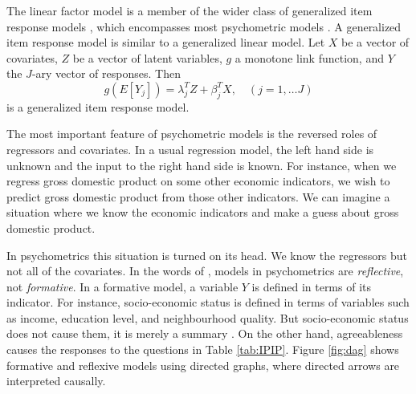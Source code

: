 The linear factor model is a member of the wider class of generalized item response models \parencite{Mellenbergh1994-iy}, which encompasses most psychometric models \parencite[Chapter 3.1]{Borsboom2005-iq}. A generalized item response model is similar to a generalized linear model. Let $X$ be a vector of covariates, $Z$ be a vector of latent variables, $g$ a monotone link function, and $Y$ the $J$-ary vector of responses. Then 
\begin{equation}
g(E[Y_{j}])=\lambda_{j}^{T}Z+\beta_{j}^{T}X,\quad(j=1,\ldots J)\label{eq:GLIRT model}
\end{equation}
is a generalized item response model.

The most important feature of psychometric models is the reversed roles of regressors and covariates. In a usual regression model, the left hand side is unknown and the input to the right hand side is known. For instance, when we regress gross domestic product on some other economic indicators, we wish to predict gross domestic product from those other indicators. We can imagine a situation where we know the economic indicators and make a guess about gross domestic product. 

In psychometrics this situation is turned on its head. We know the regressors but not all of the covariates. In the words of \textcite[p. 61]{Borsboom2005-iq}, models in psychometrics are \emph{reflective}, not \emph{formative}. In a formative model, a variable $Y$ is defined in terms of its indicator. For instance, socio-economic status is defined in terms of variables such as income, education level, and neighbourhood quality. But socio-economic status does not cause them, it is merely a summary \parencite[p. 62]{Borsboom2005-iq}. On the other hand, agreeableness causes the responses to the questions in Table \ref{tab:IPIP}. Figure \ref{fig:dag} shows formative and reflexive models using directed graphs, where directed arrows are interpreted causally.


